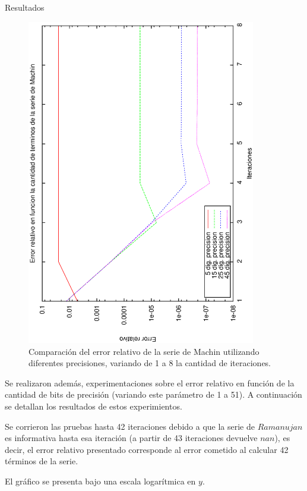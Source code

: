 \begin{section}{Resultados}
	\VSP	
	\begin{figure}[H]
	  \centering
		\includegraphics[width=10cm,angle=-90]{graficos/machin_1a8it.eps}
	  \caption{Comparación del error relativo de la serie de Machin utilizando diferentes precisiones, variando de 1 a 8 la cantidad de iteraciones.}
	  \label{fig:machin_8it}
	\end{figure}
	
	\VSP	

	Se realizaron además, experimentaciones sobre el error relativo en función de la cantidad de bits de precisión (variando este parámetro de 1 a 51). A continuación se detallan los resultados de estos experimientos.
	
	Se corrieron las pruebas hasta 42 iteraciones debido a que la serie de $Ramanujan$ es informativa hasta esa iteración (a partir de 43 iteraciones devuelve $nan$), es decir, el error relativo presentado corresponde al error cometido al calcular 42 términos de la serie.
	
	El gráfico se presenta bajo una escala logarítmica en $y$.
	

\end{section}
